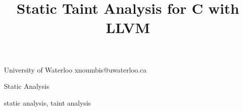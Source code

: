 \documentclass{sigplanconf}
\begin{document}


\title{Static Taint Analysis for C with LLVM}

\date{}

           {University of Waterloo}
           {xnoumbis@uwaterloo.ca}

\maketitle




\terms
Static Analysis

\keywords
static analysis, taint analysis





















\end{document}
